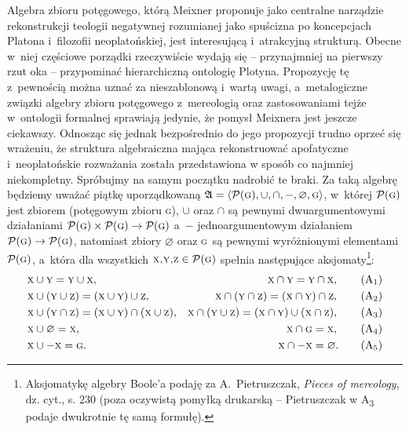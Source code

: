 Algebra zbioru potęgowego, którą Meixner proponuje jako centralne narządzie rekonstrukcji teologii negatywnej rozumianej jako spuścizna po koncepcjach Platona i~filozofii neoplatońskiej, jest interesującą i~atrakcyjną strukturą. Obecne w~niej częściowe porządki rzeczywiście wydają się -- przynajmniej na pierwszy rzut oka -- przypominać hierarchiczną ontologię Plotyna. Propozycję tę z~pewnością można uznać za nieszablonową i~wartą uwagi, a~metalogiczne związki algebry zbioru potęgowego z~mereologią oraz zastosowaniami tejże w~ontologii formalnej sprawiają jedynie, że pomysł Meixnera jest jeszcze ciekawszy. Odnosząc się jednak bezpośrednio do jego propozycji trudno oprzeć się wrażeniu, że struktura algebraiczna mająca rekonstruować apofatyczne i~neoplatońskie rozważania została przedstawiona w sposób co najmniej niekompletny. Spróbujmy na samym początku nadrobić te braki. Za taką algebrę będziemy uważać piątkę uporządkowaną $\mathfrak{A} = \langle \mathcal{P}(\textsc{g}), \cup, \cap, -, \varnothing, \textsc{g}\rangle$, w~której $\mathcal{P}(\textsc{g})$ jest zbiorem (potęgowym zbioru \textsc{g}), $\cup$ oraz $\cap$ są pewnymi dwuargumentowymi działaniami $\mathcal{P}(\textsc{g}) \times \mathcal{P}(\textsc{g}) \to \mathcal{P}(\textsc{g})$ a~$-$ jednoargumentowym działaniem $\mathcal{P}(\textsc{g}) \to \mathcal{P}(\textsc{g})$, natomiast zbiory $\varnothing$ oraz \textsc{g}~są pewnymi wyróżnionymi elementami $\mathcal{P}(\textsc{g})$, a~która dla wszystkich $\textsc{x,y,z}\in\mathcal{P}(\textsc{g})$ spełnia następujące aksjomaty\footnote{Aksjomatykę algebry Boole'a podaję za A.~Pietruszczak, \textit{Pieces of mereology}, dz. cyt., s. 230 (poza oczywistą pomyłką drukarską -- Pietruszczak w A\textsubscript{3} podaje dwukrotnie tę samą formułę).}:
\begin{align}
& \textsc{x} \cup \textsc{y} = \textsc{y} \cup \textsc{x}, & \textsc{x} \cap \textsc{y} = \textsc{y} \cap \textsc{x}, \tag{A\textsubscript{1}}\label{meiA1} \\
& \textsc{x} \cup (\textsc{y} \cup \textsc{z}) = (\textsc{x} \cup \textsc{y}) \cup \textsc{z}, & \textsc{x} \cap (\textsc{y} \cap \textsc{z}) = (\textsc{x} \cap \textsc{y}) \cap \textsc{z}, \tag{A\textsubscript{2}}\label{meiA2} \\
& \textsc{x} \cup (\textsc{y} \cap \textsc{z}) = (\textsc{x} \cup \textsc{y}) \cap (\textsc{x} \cup \textsc{z}), & \textsc{x} \cap (\textsc{y} \cup \textsc{z}) = (\textsc{x} \cap \textsc{y}) \cup (\textsc{x} \cap \textsc{z}), \tag{A\textsubscript{3}}\label{meiA3} \\
& \textsc{x} \cup \varnothing = \textsc{x}, & \textsc{x} \cap \textsc{g} = \textsc{x}, \tag{A\textsubscript{4}}\label{meiA4} \\
& \textsc{x} \cup -\textsc{x} = \textsc{g}. & \textsc{x} \cap -\textsc{x} = \varnothing. \tag{A\textsubscript{5}}\label{meiA5}
\end{align}

